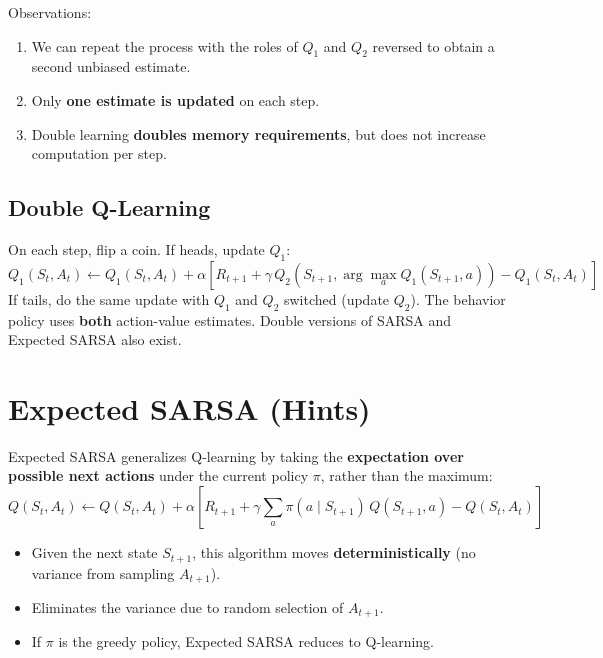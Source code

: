 \documentclass[11pt,a4paper]{article}
\theoremstyle{definition}
\theoremstyle{plain}
\theoremstyle{remark}
\begin{document}
Observations:
\begin{enumerate}
    \item We can repeat the process with the roles of $Q_1$ and $Q_2$ reversed to obtain a second unbiased estimate.
    \item Only \textbf{one estimate is updated} on each step.
    \item Double learning \textbf{doubles memory requirements}, but does not increase computation per step.
\end{enumerate}

\subsection{Double Q-Learning}

\begin{tcolorbox}[colback=blue!5!white, colframe=blue!60!black, title={Double Q-Learning Update}]
On each step, flip a coin. If heads, update $Q_1$:
\[
    Q_1(S_t, A_t) \leftarrow Q_1(S_t, A_t) + \alpha\!\left[R_{t+1} + \gamma\, Q_2\!\left(S_{t+1}, \arg\max_a Q_1(S_{t+1}, a)\right) - Q_1(S_t, A_t)\right]
\]
If tails, do the same update with $Q_1$ and $Q_2$ switched (update $Q_2$). The behavior policy uses \textbf{both} action-value estimates. Double versions of SARSA and Expected SARSA also exist.
\end{tcolorbox}

\section{Expected SARSA (Hints)}

Expected SARSA generalizes Q-learning by taking the \textbf{expectation over possible next actions} under the current policy $\pi$, rather than the maximum:
\[
    Q(S_t, A_t) \leftarrow Q(S_t, A_t) + \alpha\!\left[R_{t+1} + \gamma \sum_a \pi(a \mid S_{t+1})\, Q(S_{t+1}, a) - Q(S_t, A_t)\right]
\]
\begin{itemize}
    \item Given the next state $S_{t+1}$, this algorithm moves \textbf{deterministically} (no variance from sampling $A_{t+1}$).
    \item Eliminates the variance due to random selection of $A_{t+1}$.
    \item If $\pi$ is the greedy policy, Expected SARSA reduces to Q-learning.
\end{itemize}
\end{document}
